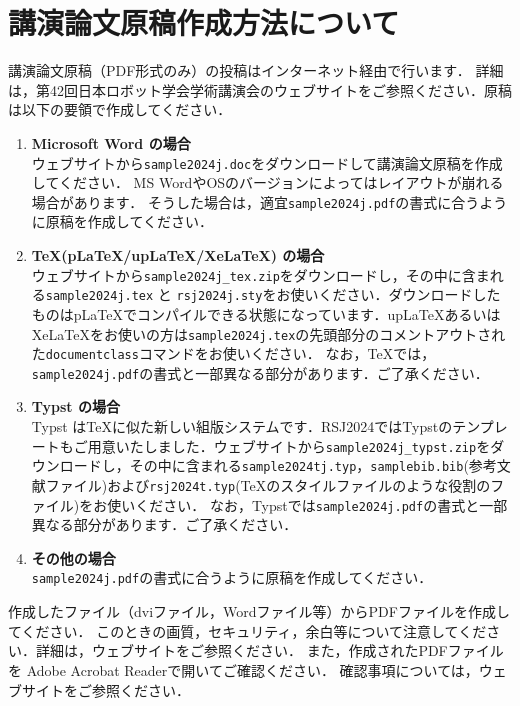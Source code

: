 \section{講演論文原稿作成方法について}
講演論文原稿（PDF形式のみ）の投稿はインターネット経由で行います．
詳細は，第42回日本ロボット学会学術講演会のウェブサイト\cite{website}をご参照ください．原稿は以下の要領で作成してください．

\begin{enumerate}
    \item {\bfseries Microsoft Word の場合}\\
    ウェブサイト\cite{website}から\verb|sample2024j.doc|をダウンロードして講演論文原稿を作成してください．
    MS WordやOSのバージョンによってはレイアウトが崩れる場合があります．
    そうした場合は，適宜\verb|sample2024j.pdf|の書式に合うように原稿を作成してください．

  \item {\bfseries \TeX (pLaTeX/upLaTeX/XeLaTeX) の場合}\\
    ウェブサイト\cite{website}から\verb|sample2024j_tex.zip|をダウンロードし，その中に含まれる\verb|sample2024j.tex| と \verb|rsj2024j.sty|をお使いください．ダウンロードしたものはpLaTeXでコンパイルできる状態になっています．upLaTeXあるいはXeLaTeXをお使いの方は\verb|sample2024j.tex|の先頭部分のコメントアウトされた\verb|documentclass|コマンドをお使いください．
    なお，\TeX では，\verb|sample2024j.pdf|の書式と一部異なる部分があります．ご了承ください．
  \item {\bfseries Typst の場合}\\
    Typst\cite{typst} は\TeX{}に似た新しい組版システムです．RSJ2024ではTypstのテンプレートもご用意いたしました．ウェブサイト\cite{website}から\verb|sample2024j_typst.zip|をダウンロードし，その中に含まれる\verb|sample2024tj.typ|，\verb|samplebib.bib|(参考文献ファイル)および\verb|rsj2024t.typ|(\TeX{}のスタイルファイルのような役割のファイル)をお使いください．
    なお，Typstでは\verb|sample2024j.pdf|の書式と一部異なる部分があります．ご了承ください．
    \item {\bfseries その他の場合}\\        
    \verb|sample2024j.pdf|の書式に合うように原稿を作成してください．
\end{enumerate}

作成したファイル（dviファイル，Wordファイル等）からPDFファイルを作成してください．
このときの画質，セキュリティ，余白等について注意してください．詳細は，ウェブサイト\cite{website}をご参照ください．
また，作成されたPDFファイルを Adobe Acrobat Readerで開いてご確認ください．
確認事項については，ウェブサイト\cite{website}をご参照ください．

